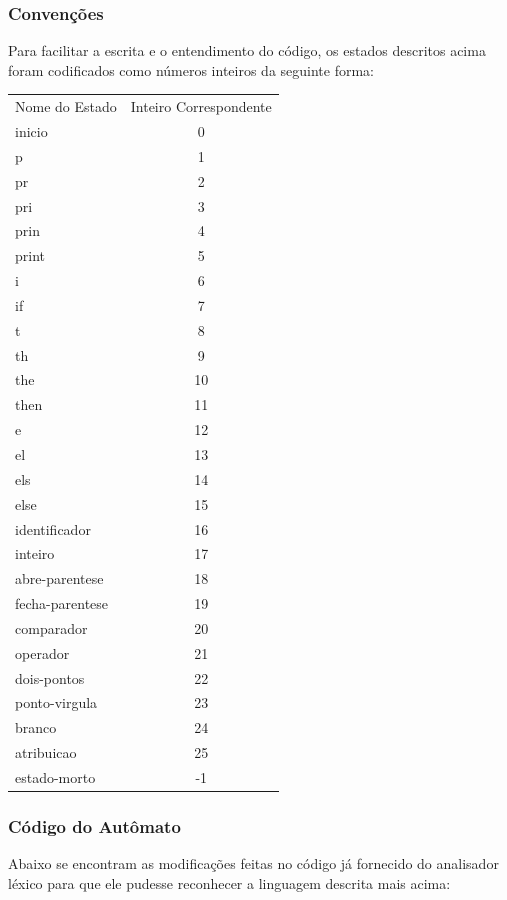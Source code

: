 \documentclass[12pt,a4paper,twoside]{report}
\begin{document}
\subsubsection{Convenções}
Para facilitar a escrita e o entendimento do código, os estados descritos acima foram codificados como números inteiros da seguinte forma:

\begin{center}
\begin{tabular} {| l | c |}
\hline
Nome do Estado & Inteiro Correspondente \\
inicio & 0 \\
p & 1 \\
pr & 2 \\
pri & 3 \\
prin & 4 \\
print & 5 \\
i & 6 \\
if & 7 \\
t & 8 \\
th & 9 \\
the & 10 \\
then & 11 \\
e & 12 \\
el & 13 \\
els & 14 \\
else & 15 \\
identificador & 16 \\
inteiro & 17 \\
abre-parentese & 18 \\
fecha-parentese & 19 \\
comparador & 20 \\
operador & 21 \\
dois-pontos & 22 \\
ponto-virgula & 23 \\
branco & 24 \\
atribuicao & 25 \\
estado-morto & -1 \\
\hline
\end{tabular}
\end{center}

\subsubsection{Código do Autômato}
Abaixo se encontram as modificações feitas no código já fornecido do analisador léxico para que ele pudesse reconhecer a linguagem descrita mais acima:


\end{document}
